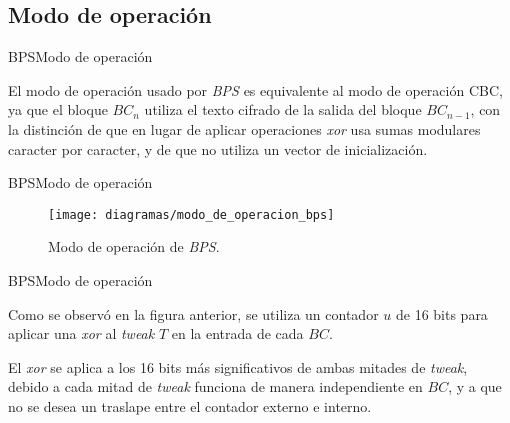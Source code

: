 %
%

\subsection{Modo de operación}

\begin{frame}{BPS}{Modo de operación}

  El modo de operación usado por \textit{BPS} es equivalente al modo de 
  operación CBC, ya que el bloque $BC_n$ utiliza el texto cifrado de la 
  salida del bloque $BC_{n-1}$, con la distinción de que en lugar de 
  aplicar operaciones \textit{xor} usa sumas modulares caracter por 
  caracter, y de que no utiliza un vector de inicialización.
  
\end{frame}

\begin{frame}{BPS}{Modo de operación}

  \begin{figure}[H]
    \begin{center}
      \texttt{[image: diagramas/modo\_de\_operacion\_bps]}
      \caption{Modo de operación de \textit{BPS}.}
     \end{center}
  \end{figure}
  
\end{frame}

\begin{frame}{BPS}{Modo de operación}

  Como se observó en la figura anterior, se utiliza un contador $u$ de 16 
  bits para aplicar una \textit{xor} al \textit{tweak} $T$ en la entrada de
  cada $BC$. 

  El \textit{xor} se aplica a los 16 bits más significativos de ambas mitades 
  de \textit{tweak}, debido a cada mitad de \textit{tweak} funciona de manera
  independiente en $BC$, y a que no se desea un traslape entre el contador
  externo e interno.
  
\end{frame}

